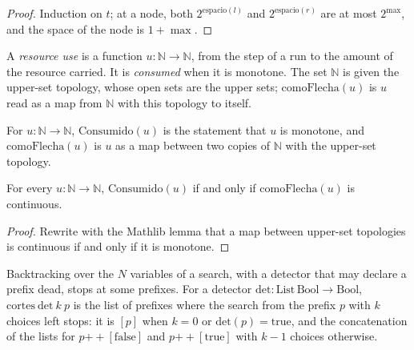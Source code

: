 \begin{proof}
  \leanok
  Induction on $t$; at a node, both $2^{\mathrm{espacio}(l)}$ and $2^{\mathrm{espacio}(r)}$ are at
  most $2^{\max}$, and the space of the node is $1 + \max$.
\end{proof}

A \emph{resource use} is a function $u : \mathbb{N} \to \mathbb{N}$, from the step of a run to the
amount of the resource carried. It is \emph{consumed} when it is monotone. The set $\mathbb{N}$ is
given the upper-set topology, whose open sets are the upper sets; $\mathrm{comoFlecha}(u)$ is $u$
read as a map from $\mathbb{N}$ with this topology to itself.

\begin{definition}
  \label{def:dynamics-consumido}
  \leanok
  For $u : \mathbb{N} \to \mathbb{N}$, $\mathrm{Consumido}(u)$ is the statement that $u$ is
  monotone, and $\mathrm{comoFlecha}(u)$ is $u$ as a map between two copies of $\mathbb{N}$ with the
  upper-set topology.
  \own{}
\end{definition}

\begin{theorem}
  \label{thm:dynamics-consumed-continuous}
  \leanok
  For every $u : \mathbb{N} \to \mathbb{N}$, $\mathrm{Consumido}(u)$ if and only if
  $\mathrm{comoFlecha}(u)$ is continuous.
  \own{}
\end{theorem}

\begin{proof}
  \leanok
  Rewrite with the Mathlib lemma that a map between upper-set topologies is continuous if and only
  if it is monotone.
\end{proof}

Backtracking over the $N$ variables of a search, with a detector that may declare a prefix dead,
stops at some prefixes. For a detector $\mathrm{det} : \mathrm{List}\,\mathrm{Bool} \to \mathrm{Bool}$,
$\mathrm{cortes}\ \mathrm{det}\ k\ p$ is the list of prefixes where the search from the prefix $p$
with $k$ choices left stops: it is $[p]$ when $k = 0$ or $\mathrm{det}(p) = \mathrm{true}$, and the
concatenation of the lists for $p \mathbin{+\!\!+} [\mathrm{false}]$ and
$p \mathbin{+\!\!+} [\mathrm{true}]$ with $k - 1$ choices otherwise.

